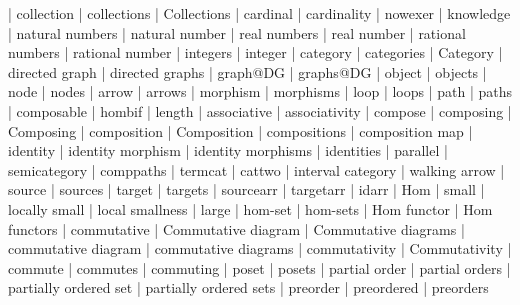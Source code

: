     |   collection
    |   collections
    |   Collections
    |   cardinal
    |   cardinality
    |   nowexer
    |   knowledge
    |   natural numbers
    |   natural number
    |   real numbers
    |   real number
    |   rational numbers
    |   rational number
    |   integers
    |   integer
    |   category
    |   categories
    |   Category
    |   directed graph
    |   directed graphs
    |   graph@DG
    |   graphs@DG
    |   object
    |   objects
    |   node
    |   nodes
    |   arrow
    |   arrows
    |   morphism
    |   morphisms
    |   loop
    |   loops
    |   path
    |   paths
    |   composable
    |   hombif
    |   length
    |   associative
    |   associativity
    |   compose
    |   composing
    |   Composing
    |   composition
    |   Composition
    |   compositions
    |   composition map
    |   identity
    |   identity morphism
    |   identity morphisms
    |   identities
    |   parallel
    |   semicategory
    |   comppaths
    |   termcat
    |   cattwo
    |   interval category
    |   walking arrow
    |   source
    |   sources
    |   target
    |   targets
    |   sourcearr
    |   targetarr
    |   idarr
    |   Hom
    |   small
    |   locally small
    |   local smallness
    |   large
    |   hom-set
    |   hom-sets
    |   Hom functor
    |   Hom functors
    |   commutative
    |   Commutative diagram
    |   Commutative diagrams
    |   commutative diagram
    |   commutative diagrams
    |   commutativity
    |   Commutativity
    |   commute
    |   commutes
    |   commuting
    |   poset
    |   posets
    |   partial order
    |   partial orders
    |   partially ordered set
    |   partially ordered sets
    |   preorder
    |   preordered
    |   preorders
